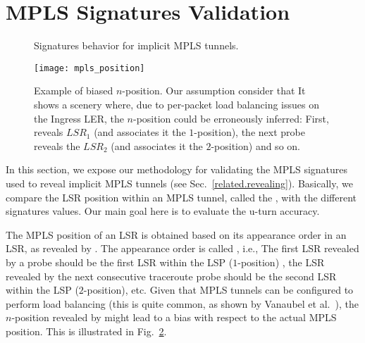 \section{MPLS Signatures Validation}\label{validation}
\begin{figure}[!t]
  \begin{center}
\hspace{-0.3cm}      
  \end{center}
  \caption{Signatures behavior for implicit MPLS tunnels.}
  \label{validation.signatures.fig}
\end{figure}

\begin{figure}[!t]
  \begin{center}
    \texttt{[image: mpls\_position]}
  \end{center}
  \caption{Example of biased $n$-position. 
  Our assumption consider that
  It shows a scenery where, due to per-packet load balancing issues on the
  Ingress LER, the $n$-position could be erroneously inferred: First,
  \traceroute reveals  $LSR_{1}$ (and associates it the $1$-position), the next
  \traceroute probe reveals the $LSR_{2}$ (and associates it the $2$-position)
  and so on.}
  \label{validation.MPLSpositionFig}
\end{figure}

In this section, we expose our methodology for validating the MPLS signatures
used to reveal implicit MPLS tunnels (see Sec.~\ref{related.revealing}).
Basically, we compare the LSR position within an MPLS tunnel, called the
, with the different signatures values. Our main goal here is
to evaluate the u-turn accuracy.

The MPLS position of an LSR is obtained based on its appearance order in an LSR,
as revealed by \traceroute.  The appearance order is called ,
i.e., The first LSR revealed by a \traceroute probe should be the first LSR
within the LSP ($1$-position) , the LSR revealed by the next consecutive
traceroute probe should be the second LSR within the LSP ($2$-position), etc.
Given that MPLS tunnels can be configured to perform load balancing (this is
quite common, as shown by Vanaubel et al.~\cite{Vanaubel15}), the $n$-position
revealed by \traceroute might lead to a bias with respect to the actual MPLS
position. This is illustrated in Fig.~\ref{validation.MPLSpositionFig}.

